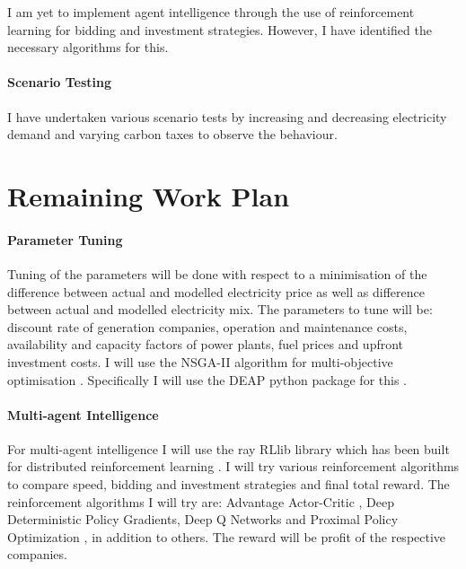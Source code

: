 \documentclass[12pt]{article}
\begin{document}
I am yet to implement agent intelligence through the use of reinforcement learning for bidding and investment strategies. However, I have identified the necessary algorithms for this.


\paragraph{Scenario Testing}

I have undertaken various scenario tests by increasing and decreasing electricity demand and varying carbon taxes to observe the behaviour.







\clearpage

\section{Remaining Work Plan}

\paragraph{Parameter Tuning}

Tuning of the parameters will be done with respect to a minimisation of the difference between actual and modelled electricity price as well as difference between actual and modelled electricity mix. The parameters to tune will be: discount rate of generation companies, operation and maintenance costs, availability and capacity factors of power plants, fuel prices and upfront investment costs. I will use the NSGA-II algorithm for multi-objective optimisation \cite{Valkanas2014}. Specifically I will use the DEAP python package for this \cite{Gagn2012}.

\paragraph{Multi-agent Intelligence}

For multi-agent intelligence I will use the ray RLlib library which has been built for distributed reinforcement learning \cite{Liang2014}. I will try various reinforcement algorithms to compare speed, bidding and investment strategies and final total reward. The reinforcement algorithms I will try are: Advantage Actor-Critic \cite{Mnih2016}, Deep Deterministic Policy Gradients, Deep Q Networks \cite{Mnih2013} and Proximal Policy Optimization \cite{Schulman2017}, in addition to others. The reward will be profit of the respective companies.
\end{document}
